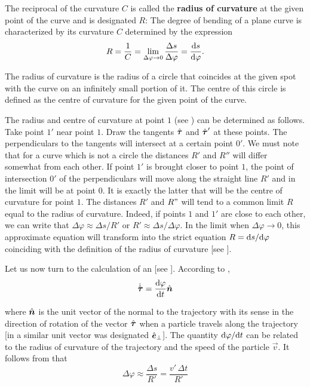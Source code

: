 The reciprocal of the curvature $C$ is called the \textbf{radius of curvature} at the given point of the curve and is designated $R$:
The degree of bending of a plane curve is characterized by its curvature $C$ determined by the expression
\begin{equation}\label{eq:1_87}
R = \frac{1}{C} = \lim_{\Delta\varphi\to 0} \frac{\Delta s}{\Delta\varphi} = \frac{\mathrm{d} s}{\mathrm{d}\varphi}.
\end{equation}

\noindent
The radius of curvature is the radius of a circle that coincides at the given spot with the curve on an infinitely small portion of it. The centre of this circle is defined as the centre of curvature for the given point of the curve.

The radius and centre of curvature at point $1$ (see ) can be determined as follows. Take point $1'$ near point $1$. Draw the tangents $\hat{\boldsymbol{\tau}}$ and $\hat{\boldsymbol{\tau}}'$ at these points. The perpendiculars to the tangents will intersect at a certain point $0'$. We must note that for a curve which is not a circle the distances $R'$ and $R''$ will differ somewhat from each other. If point $1'$ is brought closer to point $1$, the point of intersection $0'$ of the perpendiculars will move along the straight line $R'$ and in the limit will be at point $0$. It is exactly the latter that will be the centre of curvature for point $1$. The distances $R'$ and $R"$ will tend to a common limit $R$ equal to the radius of curvature. Indeed, if points $1$ and $1'$ are close to each other, we can write that $\Delta\varphi\approx\Delta s/R'$ or $R' \approx \Delta s/\Delta\varphi$. In the limit when $\Delta\varphi\to 0$, this approximate equation will transform into the strict equation $R=\mathrm{d} s/\mathrm{d}\varphi$ coinciding with the definition of the radius of curvature [see ].

Let us now turn to the calculation of an [see ]. According to ,
\begin{equation}\label{eq:1_88}
\dot{\hat{\boldsymbol{\tau}}} = \frac{\mathrm{d}\varphi}{\mathrm{d} t}\hat{\boldsymbol{n}}
\end{equation}

\noindent
where $\hat{\boldsymbol{n}}$ is the unit vector of the normal to the trajectory with its sense in the direction of rotation of the vector $\hat{\boldsymbol{\tau}}$ when a particle travels along the trajectory [in  a similar unit vector was designated $\hat{\boldsymbol{e}}_{\perp}$]. The quantity $\mathrm{d}\varphi/\mathrm{d} t$ can be related to the radius of curvature of the trajectory and the speed of the particle $\vec{v}$. It follows from  that
\begin{equation*}
\Delta\varphi\approx \frac{\Delta s}{R'} = \frac{v'\,\Delta t}{R'}
\end{equation*}

